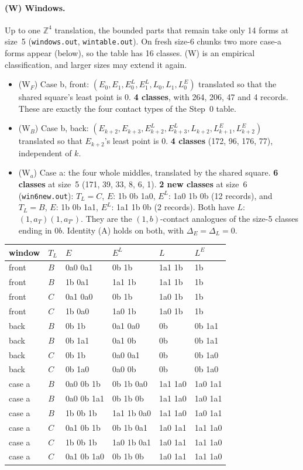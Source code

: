 \documentclass[11pt]{article}
\theoremstyle{definition}\newtheorem{definition}[theorem]{Definition}\newtheorem{remark}[theorem]{Remark}
\newcommand{\Z}{\mathbb Z}
\begin{document}
\paragraph{(W) Windows.} Up to one $\Z^4$ translation, the bounded parts that remain take only 14 forms at size~5 (\texttt{windows.out}, \texttt{wintable.out}). On fresh size-6 chunks two more case-a forms appear (below), so the table has 16 classes. (W) is an empirical classification, and larger sizes may extend it again.
\begin{itemize}
\item (W$_F$) Case b, front: $(E_0,E_1,E^L_0,E^L_1,L_0,L_1,L^E_0)$ translated so that the shared square's least point is $0$. \textbf{4 classes}, with 264, 206, 47 and 4 records. These are exactly the four contact types of the Step~0 table.
\item (W$_B$) Case b, back: $(E_{k+2},E_{k+3},E^L_{k+2},E^L_{k+3},L_{k+2},L^E_{k+1},L^E_{k+2})$ translated so that $E_{k+2}$'s least point is $0$. \textbf{4 classes} (172, 96, 176, 77), independent of $k$.
\item (W$_a$) Case a: the four whole middles, translated by the shared square. \textbf{6 classes} at size~5 (171, 39, 33, 8, 6, 1). \textbf{2 new classes} at size~6 (\texttt{win6new.out}): $T_L=C$, $E$: 1b 0b 1a0, $E^L$: 1a0 1b 0b (12 records), and $T_L=B$, $E$: 1b 0b 1a1, $E^L$: 1a1 1b 0b (2 records). Both have $L$: $(1,a_T)(1,a_{T'})$. They are the $(1,b)$-contact analogues of the size-5 classes ending in $0b$. Identity (A) holds on both, with $\Delta_E=\Delta_L=0$.
\end{itemize}
\begin{center}\small\begin{tabular}{llllll}\toprule
window & $T_L$ & $E$ & $E^L$ & $L$ & $L^E$\\\midrule
front & $B$ & 0a0 0a1 & 0b 1b & 1a1 1b & 1b\\
front & $B$ & 1b 0a1 & 1a1 1b & 1a1 1b & 1b\\
front & $C$ & 0a1 0a0 & 0b 1b & 1a0 1b & 1b\\
front & $C$ & 1b 0a0 & 1a0 1b & 1a0 1b & 1b\\
back & $B$ & 0b 1b & 0a1 0a0 & 0b & 0b 1a1\\
back & $B$ & 0b 1a1 & 0a1 0b & 0b & 0b 1a1\\
back & $C$ & 0b 1b & 0a0 0a1 & 0b & 0b 1a0\\
back & $C$ & 0b 1a0 & 0a0 0b & 0b & 0b 1a0\\
case a & $B$ & 0a0 0b 1b & 0b 1b 0a0 & 1a1 1a0 & 1a0 1a1\\
case a & $B$ & 0a0 0b 1a1 & 0b 1b 0b & 1a1 1a0 & 1a0 1a1\\
case a & $B$ & 1b 0b 1b & 1a1 1b 0a0 & 1a1 1a0 & 1a0 1a1\\
case a & $C$ & 0a1 0b 1b & 0b 1b 0a1 & 1a0 1a1 & 1a1 1a0\\
case a & $C$ & 1b 0b 1b & 1a0 1b 0a1 & 1a0 1a1 & 1a1 1a0\\
case a & $C$ & 0a1 0b 1a0 & 0b 1b 0b & 1a0 1a1 & 1a1 1a0\\\bottomrule
\end{tabular}\end{center}
\end{document}
